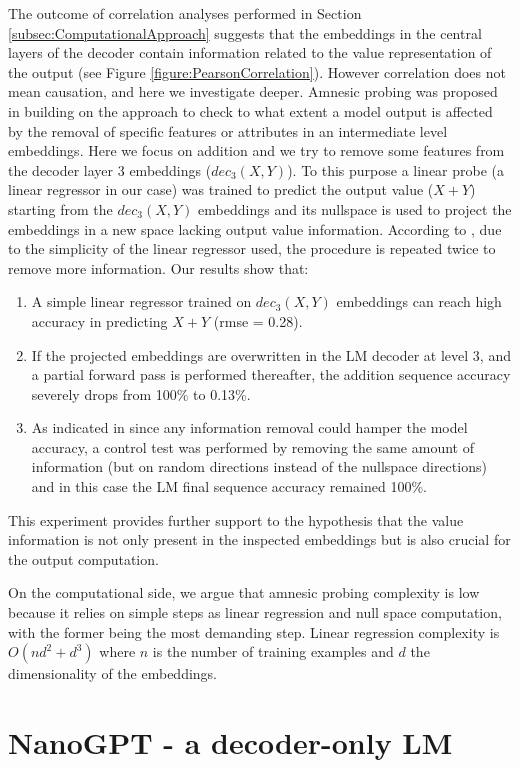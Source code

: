 \documentclass[final,1p,times,authoryear]{elsarticle}
\begin{document}
The outcome of correlation analyses performed in Section \ref{subsec:ComputationalApproach} suggests that the embeddings in the central layers of the decoder contain information related to the value representation of the output (see Figure \ref{figure:PearsonCorrelation}). However correlation does not mean causation, and here we investigate deeper. Amnesic probing was proposed in \citet{Elazar2021} building on the approach \citet{Ravfogel2020} to check to what extent a model output is affected by the removal of specific features or attributes in an intermediate level embeddings. Here we focus on addition and we try to remove some features from the decoder layer 3 embeddings ($dec_3(X,Y)$). To this purpose a linear probe (a linear regressor in our case) was trained to predict the output value ($X+Y$) starting from the $dec_3(X,Y)$ embeddings and its nullspace is used to project the embeddings in a new space lacking output value information. According to \citet{Ravfogel2020}, due to the simplicity of the linear regressor used, the procedure is repeated twice to remove more information. Our results show that:
\begin{enumerate}
\item A simple linear regressor trained on $dec_3(X,Y)$ embeddings can reach high accuracy in predicting $X+Y$ (rmse = 0.28).
\item If the projected embeddings are overwritten in the LM decoder at level 3, and a partial forward pass is performed thereafter, the addition sequence accuracy severely drops from 100\% to 0.13\%.
\item As indicated in \citet{Elazar2021} since any information removal could hamper the model accuracy, a control test was performed by removing the same amount of information (but on random directions instead of the nullspace directions) and in this case the LM final sequence accuracy remained 100\%. 
\end{enumerate}
This experiment provides further support to the hypothesis that the value information is not only present in the inspected embeddings but is also crucial for the output computation.

On the computational side, we argue that amnesic probing complexity is low because it relies on simple steps as linear regression and null space computation, with the former being the most demanding step. Linear regression complexity is $O(nd^2+d^3)$ where $n$ is the number of training examples and $d$ the dimensionality of the embeddings.

\section{NanoGPT - a decoder-only LM} \label{sec:AppendixE}
\end{document}

